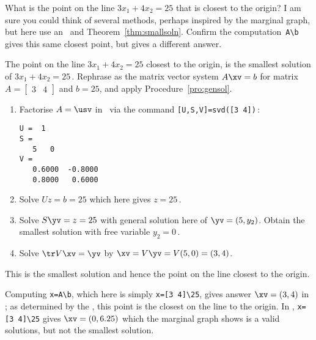 \begin{example} \label{eg:}
What is the point on the line \(3x_1+4x_2=25\) that is closest to the origin?
I am sure you could think of several methods, perhaps inspired by the marginal graph, but here use an \svd\ and Theorem~\ref{thm:smallsoln}.
Confirm the \script[2] computation~\verb|A\b| gives this same closest point, but \script[1] gives a different answer.
\begin{solution} 
The point on the line \(3x_1+4x_2=25\) closest to the origin, is the smallest solution of \(3x_1+4x_2=25\)\,.  
Rephrase as the matrix vector system \(A\xv=b\) for matrix \(A=\begin{bmatrix} 3&4 \end{bmatrix}\) and \(b=25\), and apply Procedure~\ref{pro:gensol}.
\begin{enumerate}
\item Factorise \(A=\usv\) in \script\ via the command \verb|[U,S,V]=svd([3 4])|\,:
\begin{verbatim}
U =  1
S =
   5   0
V =
   0.6000  -0.8000
   0.8000   0.6000
\end{verbatim}
\item Solve \(Uz=b=25\) which here gives \(z=25\)\,.
\item Solve \(S\yv=z=25\) with general solution here of \(\yv=(5,y_2)\). 
Obtain the smallest solution with free variable \(y_2=0\)\,.
\item Solve \(\tr V\xv=\yv\) by \(\xv=V\yv=V(5,0)=(3,4)\).  
\end{enumerate}
This is the smallest solution and hence the point on the line closest to the origin.

Computing \verb|x=A\b|, which here is simply \verb|x=[3 4]\25|, gives answer \(\xv=(3,4)\) in \script[2]; as determined by the \svd, this point is the closest on the line to the origin.
In \script[1], \verb|x=[3 4]\25| gives \(\xv=(0,6.25)\) which the marginal graph shows is a valid solutions, but not the smallest solution.
\end{solution}
\end{example}


